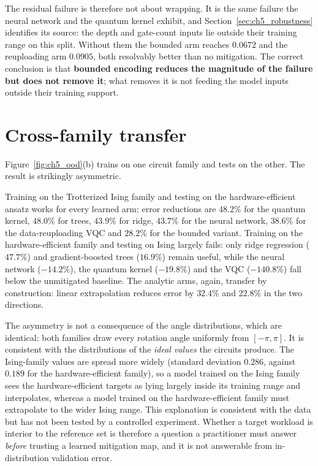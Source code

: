 \documentclass[Thesis.tex]{subfiles}
\begin{document}
The residual failure is therefore not about wrapping. It is the same failure the
neural network and the quantum kernel exhibit, and Section~\ref{sec:ch5_robustness}
identifies its source: the depth and gate-count inputs lie outside their training
range on this split. Without them the bounded arm reaches $0.0672$ and the
reuploading arm $0.0905$, both resolvably better than no mitigation. The correct
conclusion is that \textbf{bounded encoding reduces the magnitude of the failure but
does not remove it}; what removes it is not feeding the model inputs outside their
training support.

\section{Cross-family transfer}\label{sec:ch5_transfer}

Figure~\ref{fig:ch5_ood}(b) trains on one circuit family and tests on the other.
The result is strikingly asymmetric.

Training on the Trotterized Ising family and testing on the hardware-efficient
ansatz works for every learned arm: error reductions are $48.2\%$ for the quantum
kernel, $48.0\%$ for trees, $43.9\%$ for ridge, $43.7\%$ for the neural network,
$38.6\%$ for the data-reuploading VQC and $28.2\%$ for the bounded variant. Training
on the hardware-efficient family and testing on Ising largely fails: only ridge
regression ($47.7\%$) and gradient-boosted trees ($16.9\%$) remain useful, while the
neural network ($-14.2\%$), the quantum kernel ($-19.8\%$) and the VQC ($-140.8\%$)
fall below the unmitigated baseline. The analytic arms, again, transfer by
construction: linear extrapolation reduces error by $32.4\%$ and $22.8\%$ in the two
directions.

The asymmetry is not a consequence of the angle distributions, which are identical:
both families draw every rotation angle uniformly from $[-\pi, \pi]$. It is
consistent with the distributions of the \emph{ideal values} the circuits produce.
The Ising-family values are spread more widely (standard deviation $0.286$, against
$0.189$ for the hardware-efficient family), so a model trained on the Ising family
sees the hardware-efficient targets as lying largely inside its training range and
interpolates, whereas a model trained on the hardware-efficient family must
extrapolate to the wider Ising range. This explanation is consistent with the data
but has not been tested by a controlled experiment. Whether a target workload is interior to the reference set is therefore
a question a practitioner must answer \emph{before} trusting a learned mitigation
map, and it is not answerable from in-distribution validation error.
\end{document}
